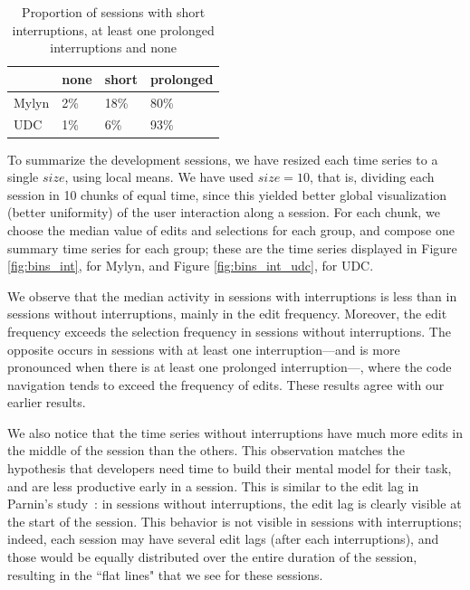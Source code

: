 \documentclass[times]{smrauth}
\begin{document}
\begin{table}[ht!]
	\small
	\renewcommand{\arraystretch}{1.3}
	\caption{Proportion of sessions with short interruptions, at least one prolonged interruptions and none} %
	\label{tbl:short_prol_int}
	\centering
	\begin{tabular}{l | p{0.6cm} | p{0.6cm} | p{0.6cm}} 
		 & none & short & prolonged  \\  
		\hline 
		Mylyn &  2\% & 18\% & 80\% \\ 
		\hline  
		UDC &  1\% & 6\% & 93\%  \\  
	\end{tabular}
\end{table}

To summarize the development sessions, we have resized each time series to a single $size$, using local means. We have used $size = 10$, that is, dividing each session in 10 chunks of equal time, since this yielded better global visualization (better uniformity) of the user interaction along a session. For each chunk, we choose the median value of edits and selections for each group, and compose one summary time series for each group; these are the time series displayed in Figure \ref{fig:bins_int}, for Mylyn, and Figure \ref{fig:bins_int_udc}, for UDC.

We observe that the median activity in sessions with interruptions is less than in sessions without interruptions, mainly in the edit frequency. Moreover, the edit frequency exceeds the selection frequency in sessions without interruptions. The opposite occurs in sessions with at least one interruption---and is more pronounced when there is at least one prolonged interruption---, where the code navigation tends to exceed the frequency of edits. These results agree with our earlier results. 

We also notice that the time series without interruptions have much more edits in the middle of the session than the others. This observation matches the hypothesis that developers need time to build their mental model for their task, and are less productive early in a session. This is similar to the edit lag in Parnin's study~\cite{PR11}: in sessions without interruptions, the edit lag is clearly visible at the start of the session. This behavior is not visible in sessions with interruptions; indeed, each session may have several edit lags (after each interruptions), and those would be equally distributed over the entire duration of the session, resulting in the ``flat lines" that we see for these sessions.
\end{document}
